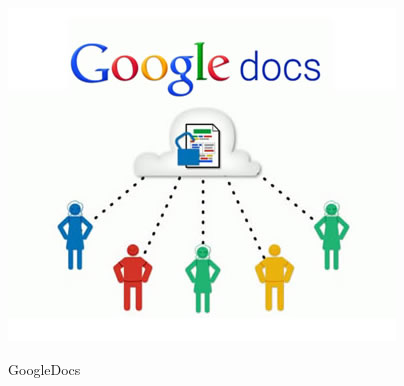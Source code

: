 %
%
%
%

\begin{figure}[!h]
  \centering
  \includegraphics[scale=0.8]{figuras/googledocs.jpg}\\
  \caption[Google Docs]{GoogleDocs \protect\cite{googledocs}}\label{fig:googledocs}
\end{figure}

